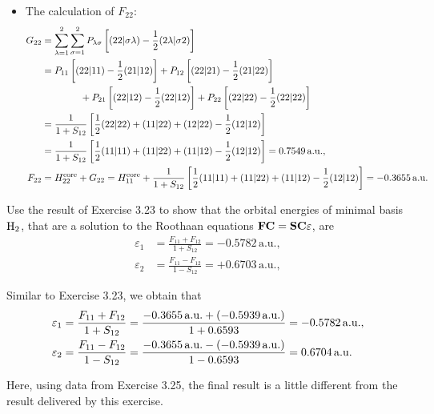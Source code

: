 \documentclass[a4paper]{book}
\newcounter{exercise}[chapter]
\newcounter{solution}[chapter]
\newcommand{\core}{{\rm core}}
\newcommand{\au}{{\rm a.u.}}
\newcommand{\C}{{\bf C}}
\newcommand{\F}{{\bf F}}
\newcommand{\SSS}{{\bf S}}
\begin{document}
\begin{solution}
\begin{itemize}
	\item The calculation of $F_{22}$:
	\begin{align*}
		G_{22} &= \sum_{ \lambda=1 }^2 \sum_{ \sigma=1 }^2 P_{ \lambda \sigma } \left[ ( 22 | \sigma \lambda ) - \frac{1}{2} ( 2 \lambda | \sigma 2 ) \right] \\
		&= P_{11} \left[ ( 22 | 11 ) - \frac{1}{2} ( 21 | 12 ) \right] + P_{12} \left[ ( 22 | 21 ) - \frac{1}{2} ( 21 | 22 ) \right] \\
		&\hspace{4em} + P_{21} \left[ ( 22 | 12 ) - \frac{1}{2} ( 22 | 12 ) \right] + P_{22} \left[ ( 22 | 22 ) - \frac{1}{2} ( 22 | 22 ) \right] \\
		&= \frac{1}{ 1 + S_{12} } \left[ \frac{1}{2} ( 22 | 22 ) + ( 11 | 22 ) + ( 12 | 22 ) - \frac{1}{2} ( 12 | 12 ) \right] \\
		&= \frac{1}{ 1 + S_{12} } \left[ \frac{1}{2} ( 11 | 11 ) + ( 11 | 22 ) + ( 11 | 12 ) - \frac{1}{2} ( 12 | 12 ) \right] = 0.7549 \, \au , \\
		F_{22} &= H^\core_{22} + G_{22} = H^\core_{11} + \frac{1}{ 1 + S_{12} } \left[ \frac{1}{2} ( 11 | 11 ) + ( 11 | 22 ) + ( 11 | 12 ) - \frac{1}{2} ( 12 | 12 ) \right] = -0.3655 \, \au
	\end{align*}
	
	\end{itemize}
	
	\end{solution}
	
	\begin{exercise}
	Use the result of Exercise 3.23 to show that the orbital energies of minimal basis $\ce{H2}$, that are a solution to the Roothaan equations $\F\C=\SSS\C{\bf \varepsilon}$, are
	\begin{align*}
		\varepsilon_1 &= \frac{ F_{11} + F_{12} }{ 1 + S_{12} } = -0.5782 \, \text{a.u.} , \\
		\varepsilon_2 &= \frac{ F_{11} - F_{12} }{ 1 - S_{12} } = +0.6703 \, \text{a.u.} ,
	\end{align*}
	\end{exercise}
	
	\begin{solution}
	
	Similar to Exercise 3.23, we obtain that
	\begin{align*}
		\varepsilon_1 &= \frac{ F_{11} + F_{12} }{ 1 + S_{12} } = \frac{ -0.3655 \, \au + ( -0.5939 \, \au ) }{ 1 + 0.6593 } = -0.5782 \, \au , \\
		\varepsilon_2 &= \frac{ F_{11} - F_{12} }{ 1 - S_{12} } = \frac{ -0.3655 \, \au - ( -0.5939 \, \au ) }{ 1 - 0.6593 } = 0.6704 \, \au
	\end{align*}
	
	Here, using data from Exercise 3.25, the final result is a little different from the result delivered by this exercise.
	
	\end{solution}
	
\end{document}
